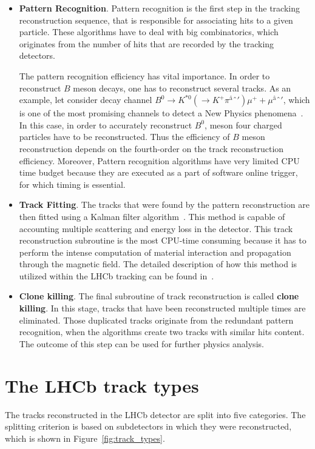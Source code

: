 \begin{itemize}
    \item \textbf{Pattern Recognition}. Pattern recognition is the first step in the tracking reconstruction sequence, that is responsible for associating hits to a given particle. These algorithms have to deal with big combinatorics, which originates from the number of hits that are recorded by the tracking detectors. 

    The pattern recognition efficiency has vital importance. In order to reconstruct $B$ meson decays, one has to reconstruct several tracks. As an example, let consider decay channel $B^0 \rightarrow K^{*0} (\rightarrow K^+\pi^â')\mu^+  + \mu^â' $, which is one of the most promising channels to detect a New Physics phenomena~\cite{k*mumu}. In this case, in order to accurately reconstruct $B^0$, meson four charged particles have to be reconstructed. Thus the efficiency of $B$ meson reconstruction depends on the fourth-order on the track reconstruction efficiency. Moreover, Pattern recognition algorithms have very limited CPU time budget because they are executed as a part of software online trigger, for which timing is essential. 
\item \textbf{Track Fitting}. The tracks that were found by the pattern reconstruction are then fitted using a Kalman filter algorithm~\cite{kalman}\cite{kalman2}. This method is capable of accounting multiple scattering and energy loss in the detector. This track reconstruction subroutine is the most CPU-time consuming because it has to perform the intense computation of material interaction and propagation through the magnetic field. The detailed description of how this method is utilized within the LHCb tracking can  be found in~\cite{lhcb_computing}. 

\item \textbf{Clone killing}. The final subroutine of track reconstruction is called \textbf{clone killing}. In this stage, tracks that have been reconstructed multiple times are eliminated. Those duplicated tracks originate from the redundant pattern recognition, when the algorithms create two tracks with similar hits content. The outcome of this step can be used for further physics analysis.   
\end{itemize}

\section{The LHCb track types}
The tracks reconstructed in the LHCb detector are split into five categories. The splitting criterion is based on subdetectors in which they were reconstructed, which is shown in Figure~\ref{fig:track_types}. 


